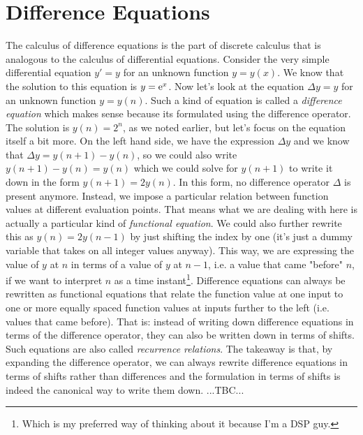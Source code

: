 \section{Difference Equations}
The calculus of difference equations is the part of discrete calculus that is analogous to the calculus of differential equations. Consider the very simple differential equation $y' = y$ for an unknown function $y = y(x)$. We know that the solution to this equation is $y = \operatorname{\mathrm{e}}^x$. Now let's look at the equation $\Delta y = y$ for an unknown function $y = y(n)$. Such a kind of equation is called a \emph{difference equation} which makes sense because its formulated using the difference operator. The solution is $y(n) = 2^n$, as we noted earlier, but let's focus on the equation itself a bit more. On the left hand side, we have the expression $\Delta y$ and we know that $\Delta y = y(n+1) - y(n)$, so we could also write $y(n+1) - y(n) = y(n)$ which we could solve for $y(n+1)$ to write it down in the form $y(n+1) = 2 y(n)$. In this form, no difference operator $\Delta$ is present anymore. Instead, we impose a particular relation between function values at different evaluation points. That means what we are dealing with here is actually a particular kind of \emph{functional equation}.  We could also further rewrite this as $y(n) = 2 y(n-1)$ by just shifting the index by one (it's just a dummy variable that takes on all integer values anyway). This way, we are expressing the value of $y$ at $n$ in terms of a value of $y$ at $n-1$, i.e. a value that came "before" $n$, if we want to interpret $n$ as a time instant\footnote{Which is my preferred way of thinking about it because I'm a DSP guy.}. Difference equations can always be rewritten as functional equations that relate the function value at one input to one or more equally spaced function values at inputs further to the left (i.e. values that came before). That is: instead of writing down difference equations in terms of the difference operator, they can also be written down in terms of shifts. Such equations are also called \emph{recurrence relations}. The takeaway is that, by expanding the difference operator, we can always rewrite difference equations in terms of shifts rather than differences and the formulation in terms of shifts is indeed the canonical way to write them down. ...TBC...


